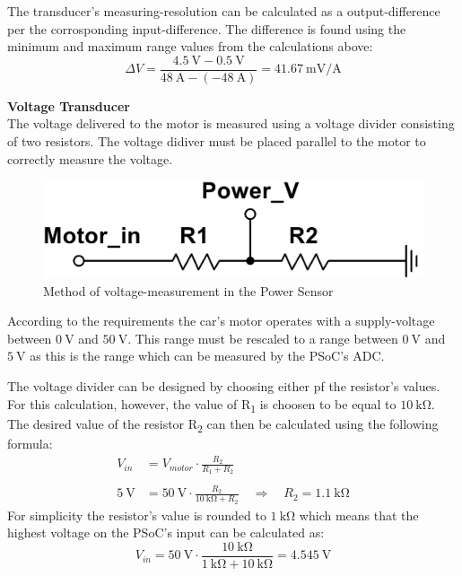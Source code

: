 The transducer's measuring-resolution can be calculated as a output-difference per the corrosponding input-difference. The difference is found using the minimum and maximum range values from the calculations above:
\begin{equation}
	\Delta V = \frac{\SI{4.5}{\volt} - \SI{0.5}{\volt}}{\SI{48}{\ampere} - (\SI{-48}{\ampere})} = \SI[per-mode = fraction]{41.67}{\milli \volt \per \ampere}
\end{equation}

\textbf{Voltage Transducer}\\
The voltage delivered to the motor is measured using a voltage divider consisting of two resistors. The voltage didiver must be placed parallel to the motor to correctly measure the voltage.

\begin{figure}[H]
	\centering
	\includegraphics[width=0.5\linewidth]{Hardware/Pictures/PowerSensor_Voltage}
	\caption{Method of voltage-measurement in the Power Sensor}
	\label{fig:PowerSensorCurrent}
\end{figure}

According to the requirements the car's motor operates with a supply-voltage between $\SI{0}{\volt}$ and $\SI{50}{\volt}$. This range must be rescaled to a range between $\SI{0}{\volt}$ and $\SI{5}{\volt}$ as this is the range which can be measured by the PSoC's ADC.

The voltage divider can be designed by choosing either pf the resistor's values. For this calculation, however, the value of R\textsubscript{1} is choosen to be equal to $\SI{10}{\kilo \ohm}$. The desired value of the resistor R\textsubscript{2} can then be calculated using the following formula:
\begin{equation}
	\begin{split}
	V_{in} &= V_{motor} \cdot \frac{R_2}{R_1 + R_2}\\
	\\
	\SI{5}{\volt} &= \SI{50}{\volt} \cdot \frac{R_2}{\SI{10}{\kilo \ohm} + R_2} \quad \Rightarrow \quad R_2 = \SI{1.1}{\kilo \ohm}
	\end{split}
\end{equation}
For simplicity the resistor's value is rounded to $\SI{1}{\kilo \ohm}$ which means that the highest voltage on the PSoC's input can be calculated as:
\begin{equation}
	V_{in} = \SI{50}{\volt} \cdot \frac{ \SI{10}{\kilo \ohm} }{ \SI{1}{\kilo \ohm} + \SI{10}{\kilo \ohm}} = \SI{4.545}{\volt}
\end{equation}

